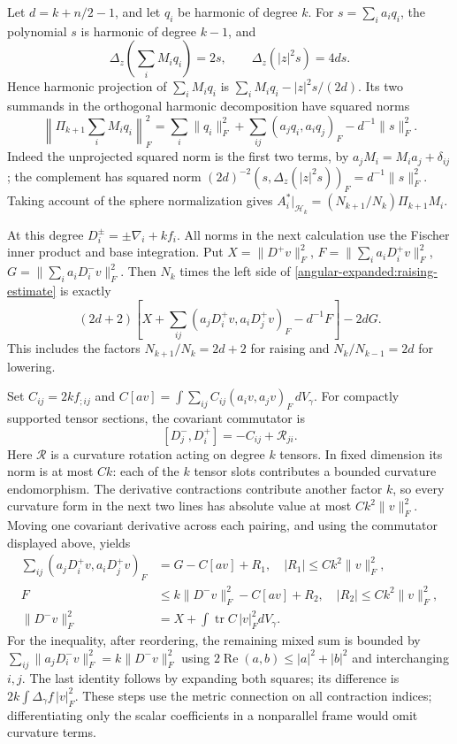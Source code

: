 \documentclass[11pt]{article}
\theoremstyle{definition}
\theoremstyle{remark}
\numberwithin{equation}{section}
\begin{document}
Let $d=k+n/2-1$, and let $q_i$ be harmonic of degree $k$.
For $s=\sum_i a_iq_i$, the polynomial $s$ is harmonic of degree $k-1$,
and
\[
 \Delta_z\left(\sum_iM_iq_i\right)=2s,\qquad
 \Delta_z(|z|^2s)=4ds.
\]
Hence harmonic projection of $\sum_iM_iq_i$ is
$\sum_iM_iq_i-|z|^2s/(2d)$.  Its two summands in the orthogonal harmonic
decomposition have squared norms
\[
 \left\|\Pi_{k+1}\sum_iM_iq_i\right\|_F^2
 =\sum_i\|q_i\|_F^2+
   \sum_{ij}(a_jq_i,a_iq_j)_F-d^{-1}\|s\|_F^2.
\]
Indeed the unprojected squared norm is the first two terms, by
$a_jM_i=M_ia_j+\delta_{ij}$; the complement has squared norm
$(2d)^{-2}(s,\Delta_z(|z|^2s))_F=d^{-1}\|s\|_F^2$.
Taking account of the sphere normalization gives
$A_i^*|_{\mathcal H_k}=(N_{k+1}/N_k)\Pi_{k+1}M_i$.

At this degree $D_i^\pm=\pm\nabla_i+kf_i$.  All norms in the next
calculation use the Fischer inner product and base integration.  Put
$X=\|D^+v\|_F^2$, $F=\|\sum_i a_iD_i^+v\|_F^2$,
$G=\|\sum_i a_iD_i^-v\|_F^2$.  Then $N_k$ times the left side of
\eqref{angular-expanded:raising-estimate} is exactly
\begin{equation}\label{angular-expanded:Fock-difference}
 (2d+2)\left[X+
 \sum_{ij}(a_jD_i^+v,a_iD_j^+v)_F-d^{-1}F\right]-2dG.
\end{equation}
This includes the factors $N_{k+1}/N_k=2d+2$ for raising and
$N_k/N_{k-1}=2d$ for lowering.

Set $C_{ij}=2k f_{;ij}$ and
$C[av]=\int\sum_{ij}C_{ij}(a_iv,a_jv)_F\,dV_\gamma$.
For compactly supported tensor sections, the covariant commutator is
\[
 [D_j^-,D_i^+]=-C_{ij}+\mathcal R_{ji}.
\]
Here $\mathcal R$ is a curvature rotation acting on degree $k$ tensors.
In fixed dimension its norm is at most $Ck$: each of the $k$ tensor
slots contributes a bounded curvature endomorphism.  The derivative
contractions contribute another factor $k$, so every curvature form in
the next two lines has absolute value at most $Ck^2\|v\|_F^2$.
Moving one covariant derivative across each pairing, and using the
commutator displayed above, yields
\begin{align}
 \sum_{ij}(a_jD_i^+v,a_iD_j^+v)_F
 &=G-C[av]+R_1,\quad |R_1|\leq Ck^2\|v\|_F^2,
 \label{angular-expanded:ibp-one}\\
 F&\leq k\|D^-v\|_F^2-C[av]+R_2,
 \quad |R_2|\leq Ck^2\|v\|_F^2,
 \label{angular-expanded:ibp-two}\\
 \|D^-v\|_F^2&=X+\int\operatorname{tr}C\,|v|_F^2dV_\gamma.
 \label{angular-expanded:ibp-three}
\end{align}
For the inequality, after reordering, the remaining mixed sum is bounded
by $\sum_{ij}\|a_jD_i^-v\|_F^2=k\|D^-v\|_F^2$ using
$2\operatorname{Re}(a,b)\leq|a|^2+|b|^2$ and interchanging $i,j$.
The last identity follows by expanding both squares; its difference is
$2k\int\Delta_\gamma f\,|v|_F^2$.  These steps use the metric
connection on all contraction indices; differentiating only the scalar
coefficients in a nonparallel frame would omit curvature terms.
\end{document}
